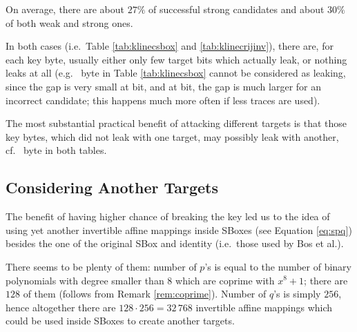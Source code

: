 	On average, there are about $27\%$ of successful strong candidates and about $30\%$ of both weak and strong ones.
	
	In both cases (i.e.\ Table \ref{tab:klinecsbox} and \ref{tab:klinecrijinv}), there are, for each key byte, usually either only few target bits which actually leak, or nothing leaks at all (e.g.\  byte in Table \ref{tab:klinecsbox} cannot be considered as leaking, since the gap is very small at  bit, and at  bit, the gap is much larger for an incorrect candidate; this happens much more often if less traces are used).
	
	The most substantial practical benefit of attacking different targets is that those key bytes, which did not leak with one target, may possibly leak with another, cf.\  byte in both tables.



\subsection{Considering Another Targets}
\label{sec:16targets}

The benefit of having higher chance of breaking the key led us to the idea of using yet another invertible affine mappings inside SBoxes (see Equation \ref{eq:spq}) besides the one of the original SBox and identity (i.e.\ those used by Bos et al.).

There seems to be plenty of them: number of $p$'s is equal to the number of binary polynomials with degree smaller than $8$ which are coprime with $x^8+1$; there are $128$ of them (follows from Remark \ref{rem:coprime}). Number of $q$'s is simply $256$, hence altogether there are $128\cdot 256 = 32\,768$ invertible affine mappings which could be used inside SBoxes to create another targets.

